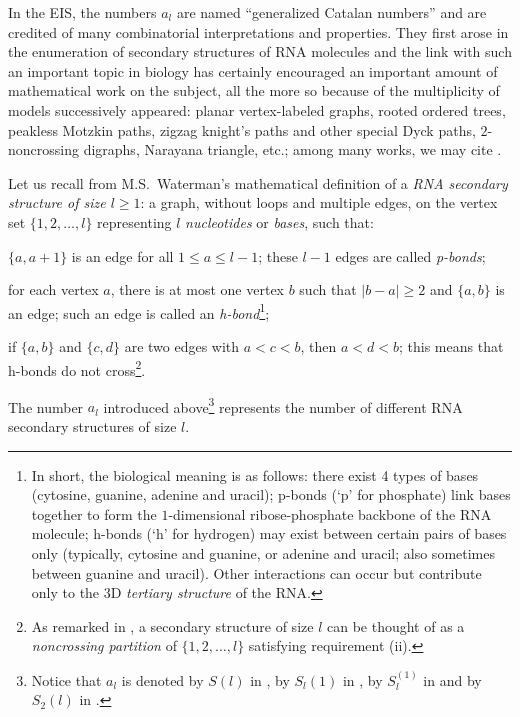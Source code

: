 \documentclass[11pt,reqno]{amsart}
\theoremstyle{plain}
\theoremstyle{definition}
\numberwithin{figure}{section}
\numberwithin{table}{section}
\numberwithin{equation}{section}
\begin{document}
In the EIS, the numbers $a_l$ are  named ``generalized Catalan numbers'' and are credited of
 many  combinatorial interpretations and properties. They first arose in the enumeration of secondary structures of RNA molecules and the link with such an important topic in biology has certainly encouraged an important amount of mathematical work on the subject, all the more so because of the multiplicity of models successively appeared: planar vertex-labeled graphs, rooted ordered trees, peakless Motzkin paths, zigzag knight's paths and other special Dyck paths, $2$-noncrossing digraphs, Narayana triangle, etc.; among many works, we may cite \cite{Waterman78,SW79,HSS98,DS02,DSV04,JQR08,Barry11,ABR20,Prodinger23,BR23,BFR24}. 

Let us recall from \cite{Waterman78} M.S.~Waterman's mathematical definition of a \emph{RNA secondary  structure of size $l≥1$}: a graph,  without loops and multiple edges, on the vertex set $\{1,2,\ldots,l\}$ representing $l$ \emph{nucleotides} or \emph{bases}, such that:
\begin{rom}
\item $\{a,a+1\}$ is an edge for all $1≤a≤l-1$; these $l-1$ edges are called \emph{p-bonds};
\item for each vertex $a$, there is at most one vertex $b$  such that $|b-a|≥2$ and $\{a,b\}$ is an edge; such an edge is called an \emph{h-bond}\footnote{In short, the biological meaning is as follows: there exist 4 types of bases (cytosine, guanine, adenine and uracil); p-bonds (`p' for phosphate) link bases together to form the $1$-dimensional ribose-phosphate backbone of the RNA molecule; h-bonds (`h' for hydrogen) may exist between certain pairs of bases only (typically, cytosine and guanine, or adenine and uracil; also sometimes between guanine and uracil). Other interactions can occur but contribute only to the 3D \emph{tertiary structure} of the RNA.};
\item if $\{a,b\}$ and $\{c,d\}$ are two edges with $a<c<b$, then $a<d<b$; this means that h-bonds do not cross\footnote{As remarked in \cite{DS02}, a  secondary  structure of size $l$ can be thought of as a \emph{noncrossing partition} of $\{1,2,\ldots,l\}$ satisfying requirement (ii).}.
\end{rom}
The number $a_l$ introduced above\footnote{Notice that $a_l$ is denoted by $S(l)$ in \cite{Waterman78}, by $S_l(1)$ in \cite{SW79}, by $S^{(1)}_l$ in \cite{DSV04} and by $S_2(l)$ in \cite{JR08}.} represents the number of different RNA secondary  structures of size $l$.
 
\end{document}
